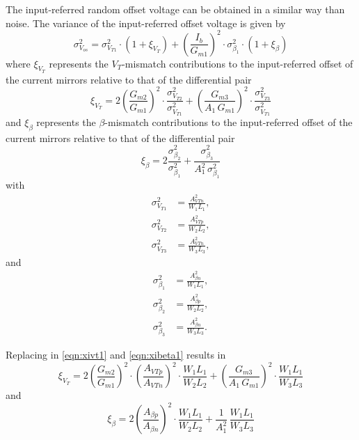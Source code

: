 \documentclass[
  a4paper,
  DIV=11,
  numbers=noendperiod]{scrreprt}
\begin{document}
The input-referred random offset voltage can be obtained in a similar
way than noise. The variance of the input-referred offset voltage is
given by \begin{equation}\label{eqn:vos}
  \sigma_{V_{os}}^2 = \sigma_{V_{T1}}^2 \cdot (1 + \xi_{V_T}) + \left(\frac{I_b}{G_{m1}}\right)^2 \cdot \sigma_{\beta_1}^2 \cdot (1 + \xi_{\beta})
\end{equation} where \(\xi_{V_T}\) represents the \(V_T\)-mismatch
contributions to the input-referred offset of the current mirrors
relative to that of the differential pair
\begin{equation}\label{eqn:xivt1}
  \xi_{V_T} = 2 \left(\frac{G_{m2}}{G_{m1}}\right)^2 \cdot \frac{\sigma_{V_{T2}}^2}{\sigma_{V_{T1}}^2} + \left(\frac{G_{m3}}{A_1\,G_{m1}}\right)^2 \cdot \frac{\sigma_{V_{T3}}^2}{\sigma_{V_{T1}}^2}
\end{equation} and \(\xi_{\beta}\) represents the \(\beta\)-mismatch
contributions to the input-referred offset of the current mirrors
relative to that of the differential pair
\begin{equation}\label{eqn:xibeta1}
  \xi_{\beta} = 2 \frac{\sigma_{\beta_2}^2}{\sigma_{\beta_1}^2} + \frac{\sigma_{\beta_3}^2}{A_1^2\,\sigma_{\beta_1}^2}
\end{equation} with \begin{align}
  \sigma_{V_{T1}}^2 &= \frac{A_{VTn}^2}{W_1 L_1},\\
  \sigma_{V_{T2}}^2 &= \frac{A_{VTp}^2}{W_2 L_2},\\
  \sigma_{V_{T3}}^2 &= \frac{A_{VTn}^2}{W_3 L_3},
\end{align} and \begin{align}
  \sigma_{\beta_1}^2 &= \frac{A_{\beta n}^2}{W_1 L_1},\\
  \sigma_{\beta_2}^2 &= \frac{A_{\beta p}^2}{W_2 L_2},\\
  \sigma_{\beta_3}^2 &= \frac{A_{\beta n}^2}{W_3 L_3}.
\end{align}

Replacing in \eqref{eqn:xivt1} and \eqref{eqn:xibeta1} results in
\begin{equation}\label{eqn:xivt2}
  \xi_{V_T} = 2 \left(\frac{G_{m2}}{G_{m1}}\right)^2 \cdot \left(\frac{A_{VTp}}{A_{VTn}}\right)^2 \cdot \frac{W_1 L_1}{W_2 L_2} + \left(\frac{G_{m3}}{A_1\,G_{m1}}\right)^2 \cdot \frac{W_1 L_1}{W_3 L_3}
\end{equation} and \begin{equation}\label{eqn:xibeta2}
  \xi_{\beta} = 2 \left(\frac{A_{\beta p}}{A_{\beta n}}\right)^2 \cdot \frac{W_1 L_1}{W_2 L_2} + \frac{1}{A_1^2}\,\frac{W_1 L_1}{W_3 L_3}
\end{equation}
\end{document}

